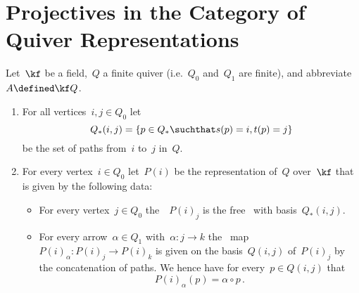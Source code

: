 \section{Projectives in the Category of Quiver Representations}


\begin{conventionnonum}
  Let~$\kf$ be a field,~$Q$ a finite quiver (i.e.~$Q_0$ and~$Q_1$ are finite), and abbreviate~$A \defined \kf Q$.
\end{conventionnonum}


\begin{definition}
  \leavevmode
  \begin{enumerate}
    \item
      For all vertices~$i, j \in Q_0$ let
      \[
        Q_*(i,j)
        =
        \{
          p \in Q_*
        \suchthat
          s(p) = i,
          t(p) = j
        \}
      \]
      be the set of paths from~$i$ to~$j$ in~$Q$.
    \item
      For every vertex~$i \in Q_0$ let~$P(i)$ be the representation of~$Q$ over~$\kf$ that is given by the following data:
      \begin{itemize}
        \item
          For every vertex~$j \in Q_0$ the~{\kvs}~$P(i)_j$ is the free~{\kvs} with basis~$Q_*(i,j)$.
        \item
          For every arrow~$\alpha \in Q_1$ with~$\alpha \colon j \to k$ the~{\klin} map~$P(i)_\alpha \colon P(i)_j \to P(i)_k$ is given on the basis~$Q(i,j)$ of~$P(i)_j$ by the concatenation of paths.
          We hence have for every~$p \in Q(i,j)$ that
          \[
            P(i)_\alpha(p)
            =
            \alpha \circ p  \,.
          \]
      \end{itemize}
  \end{enumerate}
\end{definition}



